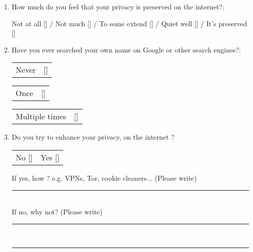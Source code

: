 \begin{mdframed}[linewidth=0pt,backgroundcolor=lightgray!20,innertopmargin = 0.1cm,innerbottommargin = 0.5cm]
\begin{enumerate}
        \newpage
        \item How much do you feel that your privacy is preserved on the internet?:
        
        Not at all [\quad] / Not much [\quad] / To some extend [\quad] / Quiet well [\quad] / It's preserved [\quad]
        
        \item Have you ever searched your own name on Google or other search engines?:
        
        \begin{tabular}{ll}
           Never & [\quad]
        \end{tabular}
        \begin{tabular}{ll}
           Once & [\quad]
        \end{tabular}
        \begin{tabular}{ll}
           Multiple times & [\quad]
        \end{tabular}
        
        \item Do you try to enhance your privacy, on the internet ?
        \begin{tabular}{ll}
            No [\quad] & Yes [\quad]
        \end{tabular}

        If yes, how ? e.g. VPNs, Tor, cookie cleaners... (Please write) \\
        \begin{left}
            \rule{0.5\textwidth}{.4pt}
        \end{left}\\
        If no, why not? (Please write) \\
        \begin{left}
            \rule{0.8\textwidth}{.4pt}
        \end{left}\\
        \begin{left}
            \rule{0.5\textwidth}{.4pt}
        \end{left}
        

\end{enumerate}
\end{mdframed}
